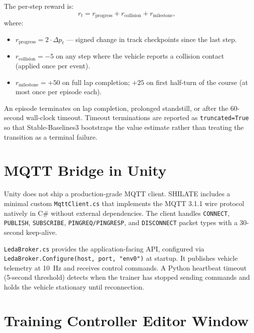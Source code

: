 The per-step reward is:
\begin{equation}
  r_t = r_{\mathrm{progress}} + r_{\mathrm{collision}} + r_{\mathrm{milestone}},
  \label{eq:reward}
\end{equation}
where:
\begin{itemize}[topsep=1.15pt,itemsep=1.15pt]
  \item $r_{\mathrm{progress}} = 2 \cdot \Delta p_t$ --- signed change in
    track checkpoints since the last step.
  \item $r_{\mathrm{collision}} = -5$ on any step where the vehicle
    reports a collision contact (applied once per event).
  \item $r_{\mathrm{milestone}} = +50$ on full lap completion;
    $+25$ on first half-turn of the course (at most once per episode
    each).
\end{itemize}
An episode terminates on lap completion, prolonged standstill, or after
the 60-second wall-clock timeout. Timeout terminations are reported as
\texttt{truncated=True} so that Stable-Baselines3 bootstraps the value
estimate rather than treating the transition as a terminal failure.

\section{MQTT Bridge in Unity}
\label{sec:unity-mqtt}

Unity does not ship a production-grade MQTT client. SHILATE includes a
minimal custom \texttt{MqttClient.cs} that implements the MQTT 3.1.1 wire
protocol \cite{OASIS2014} natively in C\# without external dependencies.
The client handles \texttt{CONNECT}, \texttt{PUBLISH},
\texttt{SUBSCRIBE}, \texttt{PINGREQ/PINGRESP}, and \texttt{DISCONNECT}
packet types with a 30-second keep-alive.

\texttt{LedaBroker.cs} provides the application-facing API, configured
via \texttt{LedaBroker.Configure(host, port, "env0")} at startup. It
publishes vehicle telemetry at 10~Hz and receives control commands. A
Python heartbeat timeout (5-second threshold) detects when the trainer
has stopped sending commands and holds the vehicle stationary until
reconnection.

\section{Training Controller Editor Window}
\label{sec:editor-window}

